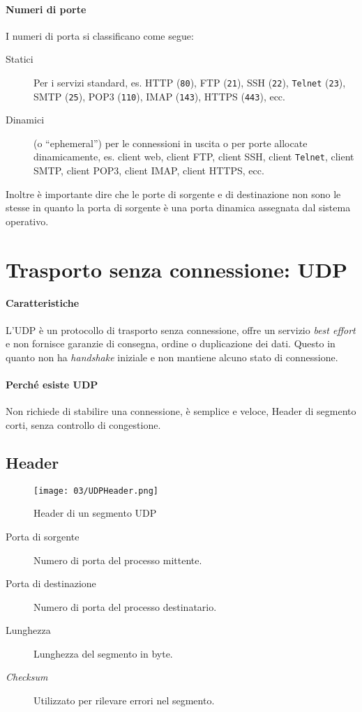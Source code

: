         \paragraph{Numeri di porte}
            I numeri di porta si classificano come segue:
            \begin{description}
                \item[Statici] Per i servizi standard, es. \Acrshort*{HTTP} (\texttt{80}), \Acrshort*{FTP} (\texttt{21}), \Acrshort*{SSH} (\texttt{22}), \texttt{Telnet} (\texttt{23}), \Acrshort*{SMTP} (\texttt{25}), \Acrshort*{POP3} (\texttt{110}), \Acrshort*{IMAP} (\texttt{143}), \Acrshort*{HTTPS} (\texttt{443}), ecc.
                \item[Dinamici] (o ``ephemeral'') per le connessioni in uscita o per porte allocate dinamicamente, es. client web, client \Acrshort*{FTP}, client \Acrshort*{SSH}, client \texttt{Telnet}, client \Acrshort*{SMTP}, client \Acrshort*{POP3}, client \Acrshort*{IMAP}, client \Acrshort*{HTTPS}, ecc.
            \end{description}
            Inoltre è importante dire che le porte di sorgente e di destinazione non sono le stesse in quanto la porta di sorgente è una porta dinamica assegnata dal sistema operativo.
\section[Trasporto senza connessione: \texttt{UDP}]{Trasporto senza connessione: \Acrshort*{UDP}}
    \paragraph{Caratteristiche} L'\acrfull*{UDP} è un protocollo di trasporto senza connessione, offre un servizio \textit{best effort} e non fornisce garanzie di consegna, ordine o duplicazione dei dati. Questo in quanto non ha \textit{handshake} iniziale e non mantiene alcuno stato di connessione. 
    \paragraph{Perché esiste \Acrshort*{UDP}} Non richiede di stabilire una connessione, è semplice e veloce, Header di segmento corti, senza controllo di congestione.
    \subsection{Header}
        \begin{figure}[H]
            \centering
            \texttt{[image: 03/UDPHeader.png]}
            \caption{Header di un segmento \Acrshort*{UDP}}
        \end{figure}
        \begin{description}
            \item[Porta di sorgente] Numero di porta del processo mittente.
            \item[Porta di destinazione] Numero di porta del processo destinatario.
            \item[Lunghezza] Lunghezza del segmento in byte.
            \item[\textit{Checksum}] Utilizzato per rilevare errori nel segmento.
        \end{description}
